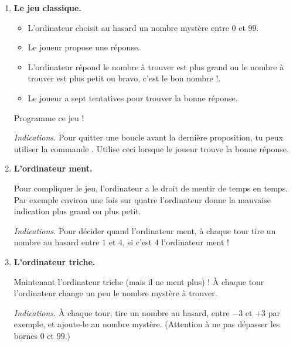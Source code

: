 \documentclass[11pt,class=report,crop=false]{standalone}
\begin{document}

\begin{activite}



\begin{enumerate}
  \item \textbf{Le jeu classique.}
  \begin{itemize}
    \item L'ordinateur choisit au hasard un nombre mystère entre $0$ et $99$.
    \item Le joueur propose une réponse.
    \item L'ordinateur répond 
    \og{}le nombre à trouver est plus grand\fg{} ou
     \og{}le nombre à trouver est plus petit\fg{} ou
      \og{}bravo, c'est le bon nombre !\fg{}. 
     \item Le joueur a sept tentatives pour trouver la bonne réponse.
  \end{itemize}
  
  Programme ce jeu !
  
  \emph{Indications.} Pour quitter une boucle  avant la dernière proposition, tu peux utiliser la commande . Utilise ceci lorsque le joueur trouve la bonne réponse.

  
  \item \textbf{L'ordinateur ment.}
  
  Pour compliquer le jeu, l'ordinateur a le droit de mentir de temps en temps.
  Par exemple environ une fois sur quatre l'ordinateur donne la mauvaise indication \og{}plus grand\fg{}
  ou \og{}plus petit\fg{}.
  
  \emph{Indications.} Pour décider quand l'ordinateur ment, à chaque tour tire un nombre au hasard entre $1$ et $4$, si c'est $4$ l'ordinateur ment !
  
  
  
  
  \item \textbf{L'ordinateur triche.}
  
  Maintenant l'ordinateur triche (mais il ne ment plus) ! À chaque tour l'ordinateur change un peu le nombre mystère à trouver.
  
    \emph{Indications.} À chaque tour, tire un nombre au hasard, entre $-3$ et $+3$ par exemple, et ajoute-le au nombre mystère. (Attention à ne pas dépasser les bornes $0$ et $99$.)
  
\end{enumerate}   
     
\end{activite}
\end{document}
